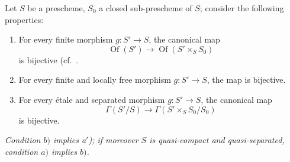\begin{proposition}[18.5.4]
\label{IV.18.5.4}
Let $S$ be a prescheme, $S_0$ a closed sub-prescheme of $S$;
consider the following properties:
\begin{enumerate}[label=\emph{\alph*)}]
  \item For every finite morphism $g:S'\to S$, the canonical map
\[
\label{IV.18.5.4.1}
\operatorname{Of}(S')\to\operatorname{Of}(S'\times_S S_0)
\tag{18.5.4.1}
\]
is bijective {\upshape(}cf.\ .
  \item[a$'$)] For every finite and locally free morphism $g:S'\to S$, the map  is bijective.
  \item For every \'etale and separated morphism $g:S'\to S$, the canonical map
\[
\label{IV.18.5.4.2}
\Gamma(S'/S)\to\Gamma(S'\times_S S_0/S_0)
\tag{18.5.4.2}
\]
is bijective.
\end{enumerate}
\emph{Condition $b)$ implies a$'$);
if moreover $S$ is quasi-compact and quasi-separated, condition $a)$ implies $b)$.}
\end{proposition}

